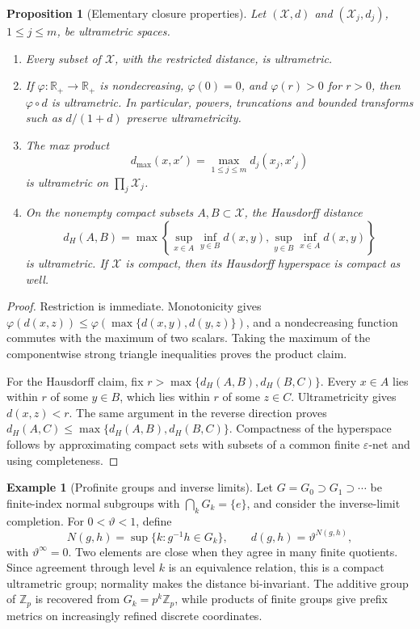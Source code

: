\documentclass[11pt,a4paper]{article}
\newtheorem{proposition}[theorem]{Proposition}
\theoremstyle{definition}
\newtheorem{example}[theorem]{Example}
\theoremstyle{remark}
\begin{document}
\begin{proposition}[Elementary closure properties]
\label{prop:ultrametric-closure}
Let \((\mathcal X,d)\) and \((\mathcal X_j,d_j)\), \(1\leq j\leq m\), be
ultrametric spaces.
\begin{enumerate}
  \item Every subset of \(\mathcal X\), with the restricted distance, is
  ultrametric.
  \item If \(\varphi:\mathbb R_+\to\mathbb R_+\) is nondecreasing,
  \(\varphi(0)=0\), and \(\varphi(r)>0\) for \(r>0\), then
  \(\varphi\circ d\) is ultrametric.  In particular, powers, truncations and
  bounded transforms such as \(d/(1+d)\) preserve ultrametricity.
  \item The max product
  \[
    d_{\max}(x,x')=\max_{1\leq j\leq m}d_j(x_j,x'_j)
  \]
  is ultrametric on \(\prod_j\mathcal X_j\).
  \item On the nonempty compact subsets \(A,B\subset\mathcal X\), the
  Hausdorff distance
  \begin{equation}
    d_H(A,B)=\max\left\{
      \sup_{x\in A}\inf_{y\in B}d(x,y),
      \sup_{y\in B}\inf_{x\in A}d(x,y)
    \right\}
    \label{eq:ultrametric-hausdorff}
  \end{equation}
  is ultrametric.  If \(\mathcal X\) is compact, then its Hausdorff
  hyperspace is compact as well.
\end{enumerate}
\end{proposition}

\begin{proof}
Restriction is immediate.  Monotonicity gives
\(\varphi(d(x,z))\leq
\varphi(\max\{d(x,y),d(y,z)\})\), and a nondecreasing function commutes with
the maximum of two scalars.  Taking the maximum of the componentwise strong
triangle inequalities proves the product claim.

For the Hausdorff claim, fix
\(r>\max\{d_H(A,B),d_H(B,C)\}\).  Every \(x\in A\) lies within \(r\) of some
\(y\in B\), which lies within \(r\) of some \(z\in C\).  Ultrametricity gives
\(d(x,z)<r\).  The same argument in the reverse direction proves
\(d_H(A,C)\leq\max\{d_H(A,B),d_H(B,C)\}\).  Compactness of the hyperspace
follows by approximating compact sets with subsets of a common finite
\(\varepsilon\)-net and using completeness.
\end{proof}

\begin{example}[Profinite groups and inverse limits]
\label{ex:profinite-ultrametric}
Let \(G=G_0\supset G_1\supset\cdots\) be finite-index normal subgroups with
\(\bigcap_kG_k=\{e\}\), and consider the inverse-limit completion.  For
\(0<\vartheta<1\), define
\[
  N(g,h)=\sup\{k:g^{-1}h\in G_k\},
  \qquad d(g,h)=\vartheta^{N(g,h)},
\]
with \(\vartheta^\infty=0\).  Two elements are close when they agree in many
finite quotients.  Since agreement through level \(k\) is an equivalence
relation, this is a compact ultrametric group; normality makes the distance
bi-invariant.  The additive group of \(\mathbb Z_p\) is recovered from
\(G_k=p^k\mathbb Z_p\), while products of finite groups give prefix metrics
on increasingly refined discrete coordinates.
\end{example}
\end{document}
